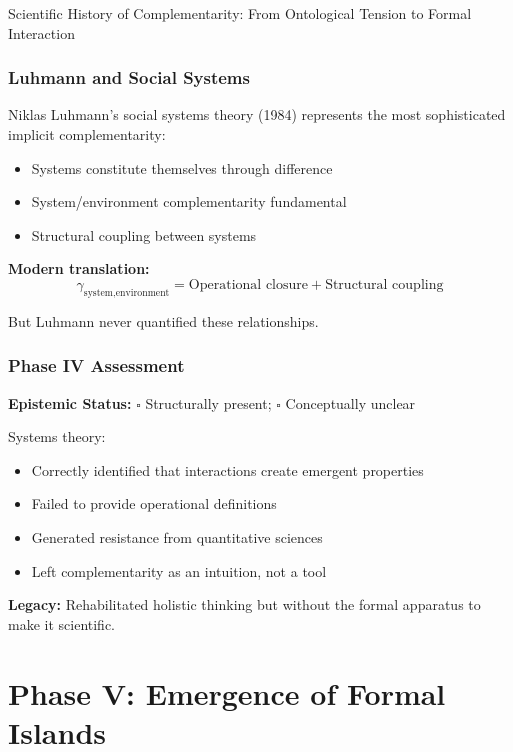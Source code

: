 \begin{chapter}{Scientific History of Complementarity: From Ontological Tension to Formal Interaction}
\subsubsection{Luhmann and Social Systems}

Niklas Luhmann's social systems theory (1984) represents the most sophisticated implicit complementarity:

\begin{itemize}[noitemsep]
    \item Systems constitute themselves through difference
    \item System/environment complementarity fundamental
    \item Structural coupling between systems
\end{itemize}

\textbf{Modern translation:}
\[
\gamma_{\text{system,environment}} = \text{Operational closure} + \text{Structural coupling}
\]

But Luhmann never quantified these relationships.

\subsubsection{Phase IV Assessment}

\begin{tcolorbox}[colback=orange!5!white,colframe=orange!75!black,title=\textbf{Phase IV Verdict}]
\textbf{Epistemic Status:} $\square$ Structurally present; $\square$ Conceptually unclear

Systems theory:
\begin{itemize}[noitemsep]
    \item Correctly identified that interactions create emergent properties
    \item Failed to provide operational definitions
    \item Generated resistance from quantitative sciences
    \item Left complementarity as an intuition, not a tool
\end{itemize}

\textbf{Legacy:} Rehabilitated holistic thinking but without the formal apparatus to make it scientific.
\end{tcolorbox}

\section{Phase V: Emergence of Formal Islands}
\label{sec:phase-v}


\end{chapter}
